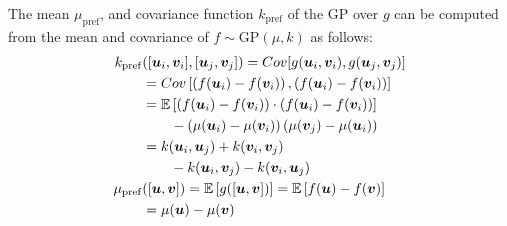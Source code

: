 \documentclass[twoside]{article}
\begin{document}
 The mean $\mu_{\mathrm{pref}}$, and covariance function $k_{\mathrm{pref}}$ of the GP over $g$ can be computed from the mean and covariance of $f\sim \mathrm{GP}(\mu,k)$ as follows:
\begin{align}
	k_{\mathrm{pref}}&([\bm{u}_i,\bm{v}_i],[\bm{u}_j,\bm{v}_j]) = Cov[g(\bm{u}_i,\bm{v}_i),g(\bm{u}_j,\bm{v}_j)]\notag\\
		&= Cov\left[\left(f(\bm{u}_i) - f(\bm{v}_i)\right) , \left(f(\bm{u}_i)  - f(\bm{v}_i)\right)\right]\notag\\
		&= \mathbb{E}\left[\left(f(\bm{u}_i) - f(\bm{v}_i)\right)\cdot \left(f(\bm{u}_i)  - f(\bm{v}_i)\right)\right]\notag\\
		& \qquad - \left(\mu(\bm{u}_i) -  \mu(\bm{v}_i)\right) \left(\mu(\bm{v}_j) - \mu(\bm{u}_i)\right)\notag\\
		&= k(\bm{u}_i,\bm{u}_j) + k(\bm{v}_i,\bm{v}_j) \notag \\
		&\qquad - k(\bm{u}_i,\bm{v}_j) - k(\bm{v}_i,\bm{u}_j)\\
	\mu_{\mathrm{pref}}&([\bm{u},\bm{v}]) = \mathbb{E}\left[g([\bm{u},\bm{v}])\right] = \mathbb{E}\left[f(\bm{u}) - f(\bm{v})\right]\notag\\
		&=\mu(\bm{u}) - \mu(\bm{v})
\end{align}
\end{document}
